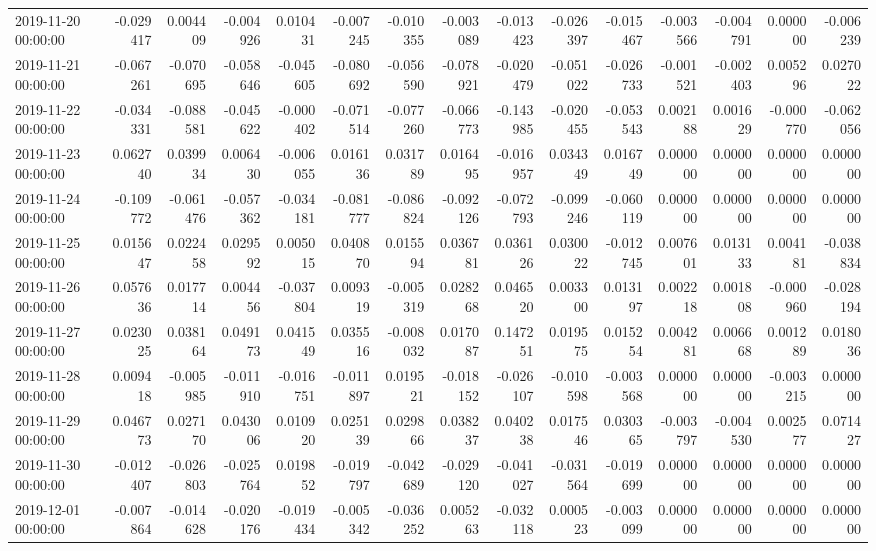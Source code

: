 \begin{tabular}{lrrrrrrrrrrrrrr}
2019-11-20 00:00:00 & -0.029417 & 0.004409 & -0.004926 & 0.010431 & -0.007245 & -0.010355 & -0.003089 & -0.013423 & -0.026397 & -0.015467 & -0.003566 & -0.004791 & 0.000000 & -0.006239 \\
2019-11-21 00:00:00 & -0.067261 & -0.070695 & -0.058646 & -0.045605 & -0.080692 & -0.056590 & -0.078921 & -0.020479 & -0.051022 & -0.026733 & -0.001521 & -0.002403 & 0.005296 & 0.027022 \\
2019-11-22 00:00:00 & -0.034331 & -0.088581 & -0.045622 & -0.000402 & -0.071514 & -0.077260 & -0.066773 & -0.143985 & -0.020455 & -0.053543 & 0.002188 & 0.001629 & -0.000770 & -0.062056 \\
2019-11-23 00:00:00 & 0.062740 & 0.039934 & 0.006430 & -0.006055 & 0.016136 & 0.031789 & 0.016495 & -0.016957 & 0.034349 & 0.016749 & 0.000000 & 0.000000 & 0.000000 & 0.000000 \\
2019-11-24 00:00:00 & -0.109772 & -0.061476 & -0.057362 & -0.034181 & -0.081777 & -0.086824 & -0.092126 & -0.072793 & -0.099246 & -0.060119 & 0.000000 & 0.000000 & 0.000000 & 0.000000 \\
2019-11-25 00:00:00 & 0.015647 & 0.022458 & 0.029592 & 0.005015 & 0.040870 & 0.015594 & 0.036781 & 0.036126 & 0.030022 & -0.012745 & 0.007601 & 0.013133 & 0.004181 & -0.038834 \\
2019-11-26 00:00:00 & 0.057636 & 0.017714 & 0.004456 & -0.037804 & 0.009319 & -0.005319 & 0.028268 & 0.046520 & 0.003300 & 0.013197 & 0.002218 & 0.001808 & -0.000960 & -0.028194 \\
2019-11-27 00:00:00 & 0.023025 & 0.038164 & 0.049173 & 0.041549 & 0.035516 & -0.008032 & 0.017087 & 0.147251 & 0.019575 & 0.015254 & 0.004281 & 0.006668 & 0.001289 & 0.018036 \\
2019-11-28 00:00:00 & 0.009418 & -0.005985 & -0.011910 & -0.016751 & -0.011897 & 0.019521 & -0.018152 & -0.026107 & -0.010598 & -0.003568 & 0.000000 & 0.000000 & -0.003215 & 0.000000 \\
2019-11-29 00:00:00 & 0.046773 & 0.027170 & 0.043006 & 0.010920 & 0.025139 & 0.029866 & 0.038237 & 0.040238 & 0.017546 & 0.030365 & -0.003797 & -0.004530 & 0.002577 & 0.071427 \\
2019-11-30 00:00:00 & -0.012407 & -0.026803 & -0.025764 & 0.019852 & -0.019797 & -0.042689 & -0.029120 & -0.041027 & -0.031564 & -0.019699 & 0.000000 & 0.000000 & 0.000000 & 0.000000 \\
2019-12-01 00:00:00 & -0.007864 & -0.014628 & -0.020176 & -0.019434 & -0.005342 & -0.036252 & 0.005263 & -0.032118 & 0.000523 & -0.003099 & 0.000000 & 0.000000 & 0.000000 & 0.000000 \\

\end{tabular}
